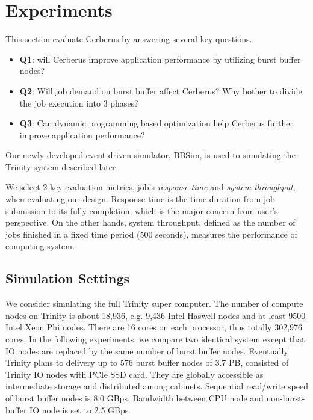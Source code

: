 \section{Experiments}
\label{Sec:Experiments}

This section evaluate Cerberus by answering several key questions.
\begin{itemize}
        \item \textbf{Q1}: will Cerberus improve application performance
                by utilizing burst buffer nodes?
        \item \textbf{Q2}: Will job demand on burst buffer affect Cerberus?
                Why bother to divide the job execution into 3 phases?
        \item \textbf{Q3}: Can dynamic programming based optimization
                help Cerberus further
improve application performance?
\end{itemize}
Our newly developed event-driven simulator, BBSim, is used to simulating
the Trinity system described later.

We select 2 key evaluation metrics, job's \textit{response time} and 
\textit{system throughput}, when evaluating our design.
Response time is the time duration from job submission to its fully completion,
which is the major concern from user's perspective.
On the other hands, system throughput, defined as the number of jobs finished in
a fixed time period (500 seconds), measures the performance of computing system.

\subsection{Simulation Settings}
We consider simulating the full Trinity super computer\cite{TrinitySystem}.
The number of compute nodes on Trinity is about 18,936,
e.g. 9,436 Intel Haswell nodes
and at least 9500 Intel Xeon Phi nodes.
There are 16 cores on each processor, thus totally 302,976 cores.
In the following experiments, we compare two identical system except that
IO nodes are replaced by the same number of burst buffer nodes.
Eventually Trinity plans to delivery up to 576 burst buffer nodes of 3.7 PB,
consisted of Trinity IO nodes with PCIe SSD card.
They are globally accessible as intermediate storage and distributed among cabinets.
Sequential read/write speed of burst buffer nodes is 8.0 GBps.
Bandwidth between CPU node and non-burst-buffer IO node is set to 2.5 GBps.

